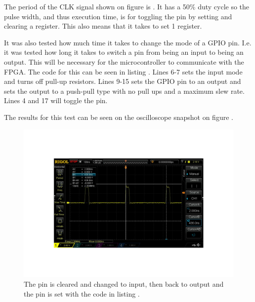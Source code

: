 The period of the CLK signal shown on figure  is . It has a 50\% duty cycle so the pulse width, and thus execution time, is  for toggling the pin by setting and clearing a register. This also means that it takes  to set 1 register.

It was also tested how much time it takes to change the mode of a GPIO pin. I.e. it was tested how long it takes to switch a pin from being an input to being an output. This will be necessary for the microcontroller to communicate with the FPGA. The code for this can be seen in listing . Lines 6-7 sets the input mode and turns off pull-up resistors. Lines 9-15 sets the GPIO pin to an output and sets the output to a push-pull type with no pull ups and a maximum slew rate. Lines 4 and 17 will toggle the pin.



The results for this test can be seen on the oscilloscope snapshot on figure .
\begin{figure}[H]
    \centering
    \includegraphics[clip, trim=0 100 0 100, width=1\textwidth]{Appendix/Figures/IOOutputToInputSpeed.pdf}
    \caption{The pin is cleared and changed to input, then back to output and the pin is set with the code in listing .}
    \label{fig:App_A_OutputInputSpeed}
\end{figure}

